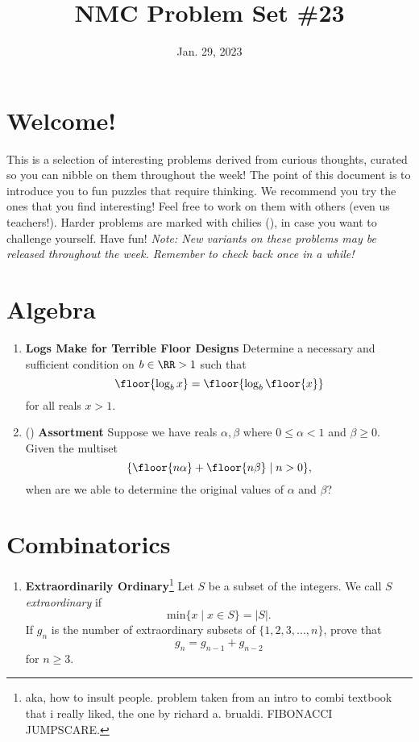 \documentclass[11pt]{scrartcl}
\begin{document}
\title{NMC Problem Set \#23} %
\date{Jan. 29, 2023} %
\maketitle

\section*{Welcome!}

This is a selection of interesting problems derived from curious thoughts, curated so you can nibble on them throughout the week! The point of this document is to introduce you to fun puzzles that require thinking. We recommend you try the ones that you find interesting! Feel free to work on them with others (even us teachers!). Harder problems are marked with chilies (\fullchili), in case you want to challenge yourself.
\newline\newline
Have fun! \textit{Note: New variants on these problems may be released throughout the week. Remember to check back once in a while!}
    
\section{Algebra}
\begin{enumerate}[label=\textbf{A\arabic*}.]
    \item \textbf{Logs Make for Terrible Floor Designs} \newline
    Determine a necessary and sufficient condition on $b \in \RR > 1$ such that
    \[ \floor{\log_b{x}} = \floor{\log_b{\floor{x}}} \]
    for all reals $x > 1$.

    \item (\fullchili) \textbf{Assortment} \newline
    Suppose we have reals $\alpha, \beta$ where $0 \leq \alpha < 1$ and $\beta \geq 0$. Given the multiset
    \[ \{ \floor{n\alpha} + \floor{n\beta} \mid n > 0 \}, \]
    when are we able to determine the original values of $\alpha$ and $\beta$?
    
\end{enumerate}

\newpage
\section{Combinatorics}
\begin{enumerate}[label=\textbf{C\arabic*}.]
    \item \textbf{Extraordinarily Ordinary}\footnote{aka, how to insult people. problem taken from an intro to combi textbook that i really liked, the one by richard a. brualdi. FIBONACCI JUMPSCARE.} \newline
    Let $S$ be a subset of the integers. We call $S$ \textit{extraordinary} if
    \[ \mathrm{min}\{x \mid x \in S\} = |S|. \]
    If $g_n$ is the number of extraordinary subsets of $\{1, 2, 3, \dots, n\}$, prove that
    \[ g_n = g_{n-1} + g_{n-2} \]
    for $n \geq 3$.
\end{enumerate}
\end{document}
